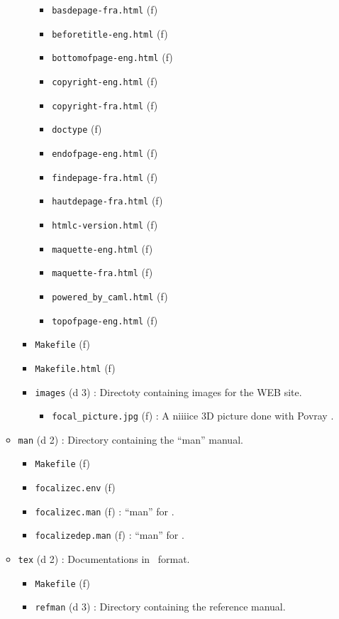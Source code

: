\begin{itemize}
\begin{itemize}
\begin{itemize}
\begin{itemize}
      \item {\tt basdepage-fra.html} (f)
      \item {\tt beforetitle-eng.html} (f)
      \item {\tt bottomofpage-eng.html} (f)
      \item {\tt copyright-eng.html} (f)
      \item {\tt copyright-fra.html} (f)
      \item {\tt doctype} (f)
      \item {\tt endofpage-eng.html} (f)
      \item {\tt findepage-fra.html} (f)
      \item {\tt hautdepage-fra.html} (f)
      \item {\tt htmlc-version.html} (f)
      \item {\tt maquette-eng.html} (f)
      \item {\tt maquette-fra.html} (f)
      \item {\tt powered\_by\_caml.html} (f)
      \item {\tt topofpage-eng.html} (f)
      \end{itemize}
    \item {\tt Makefile} (f)
    \item {\tt Makefile.html} (f)
    \item {\tt images} (d 3) : Directoty containing images for the WEB
      site.
      \begin{itemize}
      \item {\tt focal\_picture.jpg} (f) : A niiiice 3D picture done with
        Povray \smiley.
      \end{itemize}
    \end{itemize}
  \item {\tt man} (d 2) : Directory containing the ``man'' manual.
    \begin{itemize}
    \item {\tt Makefile} (f)
    \item {\tt focalizec.env} (f)
    \item {\tt focalizec.man} (f) : ``man'' for \focalizec.
    \item {\tt focalizedep.man} (f) : ``man'' for \focalizedep.
    \end{itemize}
  \item {\tt  tex} (d 2) : Documentations in \latex\ format.
    \begin{itemize}
    \item {\tt Makefile} (f)
    \item {\tt refman} (d 3) : Directory containing the reference manual.

\end{itemize}
\end{itemize}
\end{itemize}
